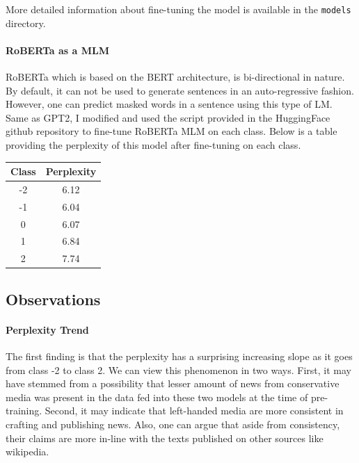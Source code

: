 \documentclass[11pt]{article}
\begin{document}
More detailed information about fine-tuning the model is available in the \texttt{models} directory.

\paragraph{RoBERTa as a MLM}
RoBERTa which is based on the BERT architecture, is bi-directional in nature. By default, it can not be used to generate sentences in an auto-regressive fashion. However, one can predict masked words in a sentence using this type of LM.
\newline
Same as GPT2, I modified and used the script provided in the HuggingFace github repository to fine-tune RoBERTa MLM on each class. Below is a table providing the perplexity of this model after fine-tuning on each class.

\begin{center}
  \begin{tabular}{cc}
    \hline
    \textbf{Class} & \textbf{Perplexity} \\
    \hline
    \hline
    -2 & 6.12 \\
    \hline
    -1 & 6.04 \\
    \hline
    0 & 6.07 \\
    \hline
    1 & 6.84 \\
    \hline
    2 & 7.74 \\
    \hline
  \end{tabular}
  \end{center}

\subsection{Observations}
\paragraph{Perplexity Trend}
The first finding is that the perplexity has a surprising increasing slope as it goes from class -2 to class 2. We can view this phenomenon in two ways. First, it may have stemmed from a possibility that lesser amount of news from conservative media was present in the data fed into these two models at the time of pre-training. Second, it may indicate that left-handed media are more consistent in crafting and publishing news. Also, one can argue that aside from consistency, their claims are more in-line with the texts published on other sources like wikipedia.
\end{document}
